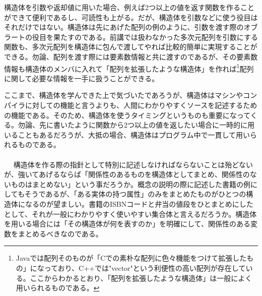 構造体を引数や返却値に用いた場合、例えば2つ以上の値を返す関数を作ることができて便利であるし、可読性も上がる。だが、構造体を引数などに使う役目はそれだけではない。構造体は先にあげた配列の例のように、引数を渡す際のオブラートの役目を果たすのである。前講では扱わなかった多次元配列を引数にする関数も、多次元配列を構造体に包んで渡してやれば比較的簡単に実現することができる。勿論、配列を渡す際には要素数情報と共に渡すのであるが、その要素数情報も構造体のメンバに入れて「配列を拡張したような構造体」を作れば\footnote{Javaでは配列そのものが「Cでの素朴な配列に色々機能をつけて拡張したもの」になっており、C++では"vector"という利便性の高い配列が存在している。ここからわかるとおり、「配列を拡張したような構造体」は一般によく用いられるものである。}配列に関して必要な情報を一手に扱うことができる。

ここまで、構造体を学んできた上で気づいたであろうが、構造体はマシンやコンパイラに対しての機能と言うよりも、人間にわかりやすくソースを記述するための機能である。そのため、構造体を使うタイミングというものも重要になってくる。勿論、先に書いたように関数から2つ以上の値を返したい場合に一時的に用いることもあるだろうが、大抵の場合、構造体はプログラム中で一貫して用いられるものである。
\\ \\　
構造体を作る際の指針として特別に記述しなければならないことは殆どないが、強いてあげるならば「関係性のあるものを構造体としてまとめ、関係性のないものはまとめない」という事だろうか。概念の説明の際に記述した書籍の例にしてもそうであるが、「ある実体の持つ属性」のみをまとめたものがひとつの構造体になるのが望ましい。書籍のISBNコードと弁当の値段をひとまとめにしたとして、それが一般にわかりやすく使いやすい集合体と言えるだろうか。構造体を用いる場合には「その構造体が何を表すのか」を明確にして、関係性のある変数をまとめるべきなのである。

